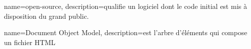 \makeglossaries

{
	name=open-source,
	description={qualifie un logiciel dont le code initial est mis à disposition du grand public.}
}

{
	name={Document Object Model},
	description={est l'arbre d'éléments qui compose un fichier HTML}
}